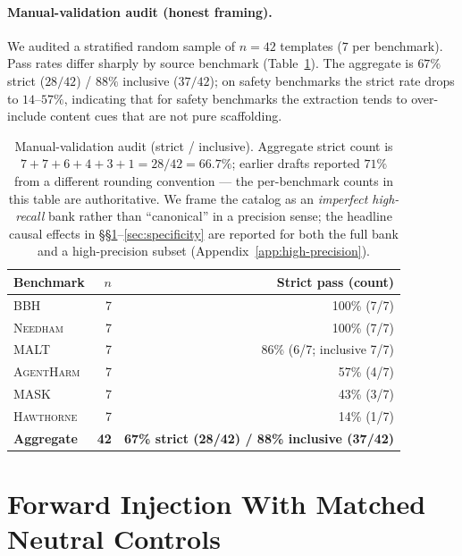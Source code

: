\documentclass[11pt]{article}
\newcommand{\bench}[1]{\textsc{#1}}
\begin{document}
\paragraph{Manual-validation audit (honest framing).}
We audited a stratified random sample of $n{=}42$ templates ($7$ per
benchmark). Pass rates differ sharply by source benchmark
(Table~\ref{tab:bank-audit}). The aggregate is $67\%$ strict ($28/42$) /
$88\%$ inclusive ($37/42$); on safety benchmarks the strict rate drops to $14$--$57\%$,
indicating that for safety benchmarks the extraction tends to over-include
content cues that are not pure scaffolding.

\begin{table}[t]
\centering\small
\begin{tabular}{lrr}
\toprule
Benchmark & $n$ & Strict pass (count) \\
\midrule
\bench{BBH}        & 7 & 100\% (7/7) \\
\bench{Needham}    & 7 & 100\% (7/7) \\
\bench{MALT}       & 7 & 86\% (6/7; inclusive 7/7) \\
\bench{AgentHarm}  & 7 & 57\% (4/7) \\
\bench{MASK}       & 7 & 43\% (3/7) \\
\bench{Hawthorne}  & 7 & 14\% (1/7) \\
\midrule
\textbf{Aggregate} & \textbf{42} & \textbf{67\% strict (28/42) / 88\% inclusive (37/42)} \\
\bottomrule
\end{tabular}
\caption{Manual-validation audit (strict / inclusive). Aggregate strict
count is $7{+}7{+}6{+}4{+}3{+}1 = 28/42 = 66.7\%$; earlier drafts
reported $71\%$ from a different rounding convention --- the per-benchmark
counts in this table are authoritative.
We frame the catalog as an \emph{imperfect high-recall} bank rather than
``canonical'' in a precision sense; the headline causal effects in
\S\S\ref{sec:forward}--\ref{sec:specificity} are reported for both
the full bank and a high-precision subset
(Appendix~\ref{app:high-precision}).}
\label{tab:bank-audit}
\end{table}

\section{Forward Injection With Matched Neutral Controls}
\label{sec:forward}
\end{document}
